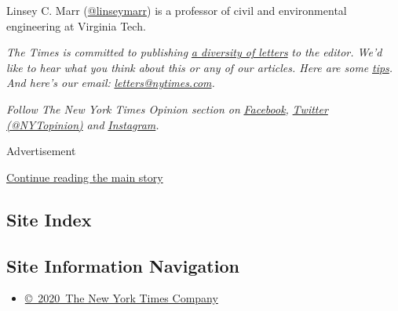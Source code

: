 Linsey C. Marr
(\href{https://twitter.com/linseymarr?lang=en}{@linseymarr}) is a
professor of civil and environmental engineering at Virginia Tech.

\emph{The Times is committed to publishing}
\href{https://www.nytimes.com/2019/01/31/opinion/letters/letters-to-editor-new-york-times-women.html}{\emph{a
diversity of letters}} \emph{to the editor. We'd like to hear what you
think about this or any of our articles. Here are some}
\href{https://help.nytimes.com/hc/en-us/articles/115014925288-How-to-submit-a-letter-to-the-editor}{\emph{tips}}\emph{.
And here's our email:}
\href{mailto:letters@nytimes.com}{\emph{letters@nytimes.com}}\emph{.}

\emph{Follow The New York Times Opinion section on}
\href{https://www.facebook.com/nytopinion}{\emph{Facebook}}\emph{,}
\href{http://twitter.com/NYTOpinion}{\emph{Twitter (@NYTopinion)}}
\emph{and}
\href{https://www.instagram.com/nytopinion/}{\emph{Instagram}}\emph{.}

Advertisement

\protect\hyperlink{after-bottom}{Continue reading the main story}

\hypertarget{site-index}{%
\subsection{Site Index}\label{site-index}}

\hypertarget{site-information-navigation}{%
\subsection{Site Information
Navigation}\label{site-information-navigation}}

\begin{itemize}
\tightlist
\item
  \href{https://help.nytimes.com/hc/en-us/articles/115014792127-Copyright-notice}{©~2020~The
  New York Times Company}
\end{itemize}


